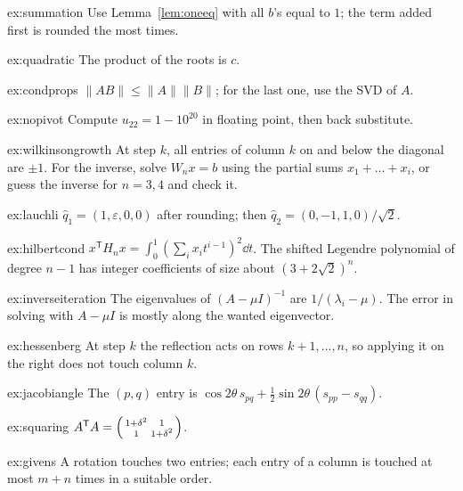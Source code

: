 \begin{hint}{ex:summation}
Use Lemma~\ref{lem:oneeq} with all $b$'s equal to $1$; the term added first is rounded the most times.
\end{hint}
\begin{hint}{ex:quadratic}
The product of the roots is $c$.
\end{hint}
\begin{hint}{ex:condprops}
$\|AB\|\le\|A\|\|B\|$; for the last one, use the SVD of $A$.
\end{hint}
\begin{hint}{ex:nopivot}
Compute $u_{22}=1-10^{20}$ in floating point, then back substitute.
\end{hint}
\begin{hint}{ex:wilkinsongrowth}
At step $k$, all entries of column $k$ on and below the diagonal are $\pm1$. For the inverse, solve $W_nx=b$ using the partial sums $x_1+\dots+x_i$, or guess the inverse for $n=3,4$ and check it.
\end{hint}
\begin{hint}{ex:lauchli}
$\hat q_1=(1,\varepsilon,0,0)$ after rounding; then $\hat q_2=(0,-1,1,0)/\sqrt2$.
\end{hint}
\begin{hint}{ex:hilbertcond}
$x^{\mathsf T}H_nx=\int_0^1(\sum_ix_it^{i-1})^2\dd t$. The shifted Legendre polynomial of degree $n-1$ has integer coefficients of size about $(3+2\sqrt2)^n$.
\end{hint}
\begin{hint}{ex:inverseiteration}
The eigenvalues of $(A-\mu I)^{-1}$ are $1/(\lambda_i-\mu)$. The error in solving with $A-\mu I$ is mostly along the wanted eigenvector.
\end{hint}
\begin{hint}{ex:hessenberg}
At step $k$ the reflection acts on rows $k+1,\dots,n$, so applying it on the right does not touch column $k$.
\end{hint}
\begin{hint}{ex:jacobiangle}
The $(p,q)$ entry is $\cos2\theta\,s_{pq}+\tfrac12\sin2\theta\,(s_{pp}-s_{qq})$.
\end{hint}
\begin{hint}{ex:squaring}
$A^{\mathsf T}A=\begin{psmallmatrix}1+\delta^2&1\\1&1+\delta^2\end{psmallmatrix}$.
\end{hint}
\begin{hint}{ex:givens}
A rotation touches two entries; each entry of a column is touched at most $m+n$ times in a suitable order.
\end{hint}

